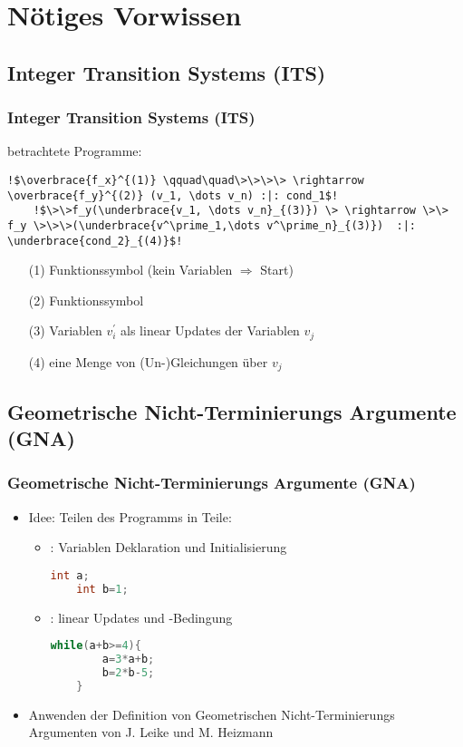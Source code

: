 \section{N{\"o}tiges Vorwissen}

\subsection{Integer Transition Systems (ITS) }
\frame{\tableofcontents[currentsection]}
\begin{frame}[fragile] %
	\frametitle{Integer Transition Systems (ITS)}
	\its betrachtete Programme:
	\begin{lstlisting}[escapechar=!]
	!$\overbrace{f_x}^{(1)} \qquad\quad\>\>\>\> \rightarrow \overbrace{f_y}^{(2)} (v_1, \dots v_n) :|: cond_1$!
	!$\>\>f_y(\underbrace{v_1, \dots v_n}_{(3)}) \> \rightarrow \>\> f_y \>\>\>(\underbrace{v^\prime_1,\dots v^\prime_n}_{(3)})  :|: \underbrace{cond_2}_{(4)}$!
	\end{lstlisting}
	
	\begin{enumerate}
		\item[(1)] Funktionssymbol (kein Variablen $\Rightarrow$ Start)
		\item[(2)] Funktionssymbol
		\item[(3)] Variablen $v^\prime_i$ als linear Updates der Variablen $v_j$
		\item[(4)] eine Menge von (Un-)Gleichungen \"uber $v_j$
	\end{enumerate}

\end{frame}

\subsection{Geometrische Nicht-Terminierungs Argumente (GNA)}
\begin{frame}[fragile]
	\frametitle{Geometrische Nicht-Terminierungs Argumente (GNA)}
	\begin{itemize}
		\item Idee: Teilen des Programms in  Teile:
			\begin{itemize}
				\item \stem: Variablen Deklaration und Initialisierung
					\begin{lstlisting}[language = java]
	int a;
	int b=1;
					\end{lstlisting}
				\item \loopt: linear Updates und -Bedingung
				\begin{lstlisting}[language = java]
	while(a+b>=4){
		a=3*a+b;
		b=2*b-5;
	}
				\end{lstlisting}
			\end{itemize}
		\item Anwenden der Definition von Geometrischen Nicht-Terminierungs Argumenten von J. Leike und M. Heizmann 
	\end{itemize}
\end{frame}

